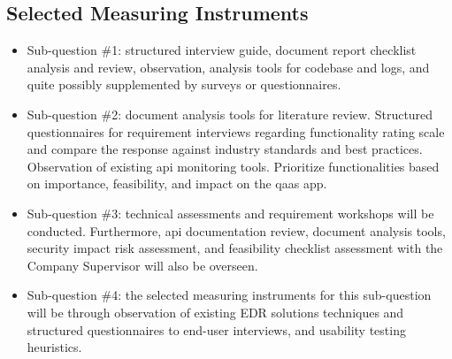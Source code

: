 \begin{itemize}[label=-]
\end{itemize}
\subsection{Selected Measuring Instruments}
\begin{itemize}[label=-]
      \item Sub-question \#1: structured interview guide, document report checklist analysis and review,
            observation, analysis tools for codebase and logs, and quite possibly supplemented by surveys
            or questionnaires.
      \item Sub-question \#2: document analysis tools for literature review. Structured questionnaires for
            requirement interviews regarding functionality rating scale and compare the response against
            industry standards and best practices. Observation of existing \acrshort{api} monitoring tools.
            Prioritize functionalities based on importance, feasibility, and impact on the \acrshort{qaas} app.
      \item Sub-question \#3: technical assessments and requirement workshops will be conducted. Furthermore,
            \acrshort{api} documentation  review, document analysis tools, security impact risk assessment,
            and feasibility checklist assessment with the Company Supervisor will also be overseen.
      \item Sub-question \#4: the selected measuring instruments for this sub-question will be through
            observation of existing EDR solutions techniques and structured questionnaires to end-user
            interviews, and usability testing heuristics.
\end{itemize}
